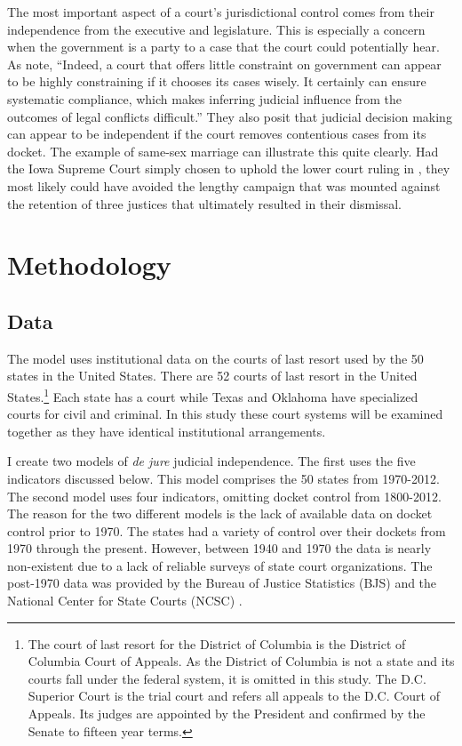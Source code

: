 \documentclass[12pt]{article}
\begin{document}
The most important aspect of a court's jurisdictional control comes from their independence from the executive and legislature.  This is especially a concern when the government is a party to a case that the court could potentially hear.  As \citet[6]{Rios2014} note, ``Indeed, a court that offers little constraint on government can appear to be highly constraining if it chooses its cases wisely. It certainly can ensure systematic compliance, which makes inferring judicial influence from the outcomes of legal conflicts difficult.''  They also posit that judicial decision making can appear to be independent if the court removes contentious cases from its docket.  The example of same-sex marriage can illustrate this quite clearly.  Had the Iowa Supreme Court simply chosen to uphold the lower court ruling in \cite{iowagay}, they most likely could have avoided the lengthy campaign that was mounted against the retention of three justices that ultimately resulted in their dismissal.


\section*{Methodology}
\subsection*{Data}
The model uses institutional data on the courts of last resort used by the 50 states in the United States.  There are 52 courts of last resort in the United States.\footnote{The court of last resort for the District of Columbia is the District of Columbia Court of Appeals.  As the District of Columbia is not a state and its courts fall under the federal system, it is omitted in this study.  The D.C. Superior Court is the trial court and refers all appeals to the D.C. Court of Appeals.  Its judges are appointed by the President and confirmed by the Senate to fifteen year terms.}  Each state has a court while Texas and Oklahoma have specialized courts for civil and criminal.  In this study these court systems will be examined together as they have identical institutional arrangements.  

I create two models of \textit{de jure} judicial independence.  The first uses the five indicators discussed below.  This model comprises the 50 states from 1970-2012.  The second model uses four indicators, omitting docket control from 1800-2012.  The reason for the two different models is the lack of available data on docket control prior to 1970.  The states had a variety of control over their dockets from 1970 through the present.  However, between 1940 and 1970 the data is nearly non-existent due to a lack of reliable surveys of state court organizations.  The post-1970 data was provided by the Bureau of Justice Statistics (BJS) and the National Center for State Courts (NCSC) \citep{BJS1993,BJS1998,BJS2004}.  
\end{document}
